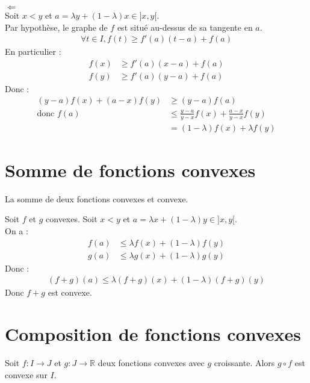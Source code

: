 \documentclass[../main.tex]{subfiles}
\begin{document}
$\boxed{\Leftarrow}$ \\
Soit $x < y$ et $a = \lambda y + (1-\lambda)x \in ]x, y[$. \\
Par hypothèse, le graphe de $f$ est situé au-dessus de sa tangente en $a$. 
\begin{align*}
    \forall t \in I, f(t) \geq f'(a)(t-a) + f(a)
\end{align*}
En particulier :
\begin{align*}
    f(x) &\geq f'(a)(x-a) + f(a) \\
    f(y) &\geq f'(a)(y-a) + f(a)
\end{align*}
Donc : 
\begin{align*}
    (y-a)f(x) + (a-x)f(y) &\geq (y-a)f(a) \\
    \text{donc } f(a) &\leq \frac{y-a}{y-x}f(x) + \frac{a-x}{y-x}f(y) \\
    &= (1-\lambda)f(x) + \lambda f(y)
\end{align*}

\section{Somme de fonctions convexes}
\begin{tcolorbox}[title=Propostion 19.17, title filled=false, colframe=lightblue, colback=lightblue!10!white]
    La somme de deux fonctions convexes et convexe. 
\end{tcolorbox}

\noindent Soit $f$ et $g$ convexes. Soit $x < y$ et $a = \lambda x + (1-\lambda)y \in ]x, y[$. \\
On a :
\begin{align*}
    f(a) &\leq \lambda f(x) + (1-\lambda)f(y) \\
    g(a) &\leq \lambda g(x) + (1-\lambda)g(y)
\end{align*}
Donc :
\begin{align*}
    (f+g)(a) \leq \lambda (f+g)(x) + (1-\lambda)(f+g)(y)
\end{align*}
Donc $f+g$ est convexe.

\section{Composition de fonctions convexes}
\begin{tcolorbox}[title=Propostion 19.18, title filled=false, colframe=lightblue, colback=lightblue!10!white]
    Soit $f:I\to J$ et $g:J\to \mathbb{R}$ deux fonctions convexes avec $g$ croissante. Alors $g\circ f$ est convexe sur $I$. 
\end{tcolorbox}
\end{document}
